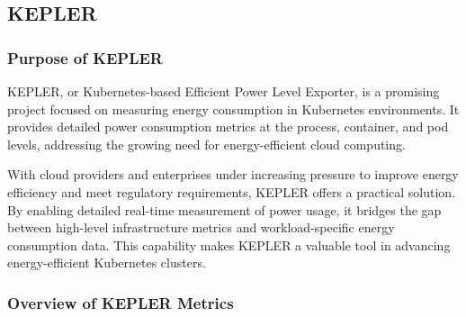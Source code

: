 \subsection{KEPLER}

\subsubsection{Purpose of KEPLER}
KEPLER, or Kubernetes-based Efficient Power Level Exporter, is a promising project focused on measuring energy consumption in Kubernetes environments. It provides detailed power consumption metrics at the process, container, and pod levels, addressing the growing need for energy-efficient cloud computing.

With cloud providers and enterprises under increasing pressure to improve energy efficiency and meet regulatory requirements, KEPLER offers a practical solution. By enabling detailed real-time measurement of power usage, it bridges the gap between high-level infrastructure metrics and workload-specific energy consumption data. This capability makes KEPLER a valuable tool in advancing energy-efficient Kubernetes clusters.
\subsubsection{Overview of KEPLER Metrics}

